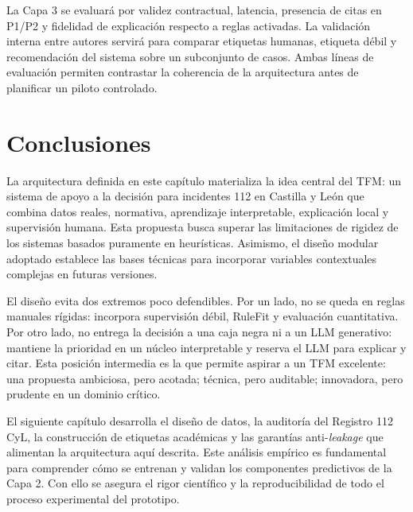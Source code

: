 La Capa 3 se evaluará por validez contractual, latencia, presencia de citas en P1/P2 y fidelidad de explicación respecto a reglas activadas. La validación interna entre autores servirá para comparar etiquetas humanas, etiqueta débil y recomendación del sistema sobre un subconjunto de casos. Ambas líneas de evaluación permiten contrastar la coherencia de la arquitectura antes de planificar un piloto controlado.

\section{Conclusiones}

La arquitectura definida en este capítulo materializa la idea central del TFM: un sistema de apoyo a la decisión para incidentes 112 en Castilla y León que combina datos reales, normativa, aprendizaje interpretable, explicación local y supervisión humana. Esta propuesta busca superar las limitaciones de rigidez de los sistemas basados puramente en heurísticas. Asimismo, el diseño modular adoptado establece las bases técnicas para incorporar variables contextuales complejas en futuras versiones.

El diseño evita dos extremos poco defendibles. Por un lado, no se queda en reglas manuales rígidas: incorpora supervisión débil, RuleFit y evaluación cuantitativa. Por otro lado, no entrega la decisión a una caja negra ni a un LLM generativo: mantiene la prioridad en un núcleo interpretable y reserva el LLM para explicar y citar. Esta posición intermedia es la que permite aspirar a un TFM excelente: una propuesta ambiciosa, pero acotada; técnica, pero auditable; innovadora, pero prudente en un dominio crítico.

El siguiente capítulo desarrolla el diseño de datos, la auditoría del Registro 112 CyL, la construcción de etiquetas académicas y las garantías anti-\textit{leakage} que alimentan la arquitectura aquí descrita. Este análisis empírico es fundamental para comprender cómo se entrenan y validan los componentes predictivos de la Capa 2. Con ello se asegura el rigor científico y la reproducibilidad de todo el proceso experimental del prototipo.
